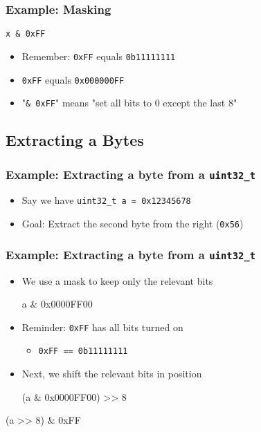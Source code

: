 \begin{frame}
  \frametitle{Example: Masking}
  \begin{center}
    \texttt{x \& 0xFF}
  \end{center}
  \begin{itemize}
    \item Remember: \texttt{0xFF} equals \texttt{0b11111111}
    \item \texttt{0xFF} equals \texttt{0x000000FF}
    \item "\texttt{\& 0xFF}" means "set all bits to 0 except the last 8"
  \end{itemize}
\end{frame}

\subsection{Extracting a Bytes}
\frame{\tableofcontents[currentsubsection]}

\begin{frame}
  \frametitle{Example: Extracting a byte from a \texttt{uint32\_t}}
  \begin{itemize}
    \item Say we have \texttt{uint32\_t a = 0x12345678}
    \item Goal: Extract the second byte from the right (\texttt{0x56})
  \end{itemize}
\end{frame}

\begin{frame}
  \frametitle{Example: Extracting a byte from a \texttt{uint32\_t}}
  \begin{itemize}
    \item We use a mask to keep only the relevant bits
          \begin{center} \ttfamily
            a \& 0x0000FF00
          \end{center}
    \item Reminder: \texttt{0xFF} has all bits turned on
          \begin{itemize}
            \item \texttt{0xFF == 0b11111111}
          \end{itemize}
    \item Next, we shift the relevant bits in position
          \begin{center} \ttfamily
            (a \& 0x0000FF00) >> 8
          \end{center}
  \end{itemize}
  \vskip4mm
  \begin{center} \ttfamily
    (a >> 8) \& 0xFF
  \end{center}
\end{frame}

